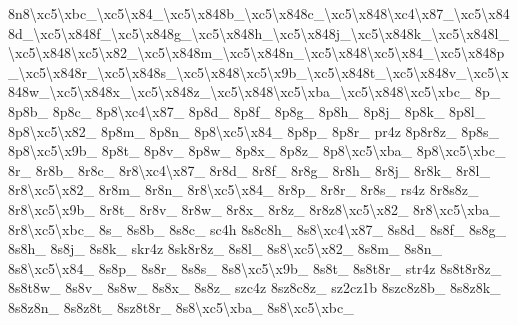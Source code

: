 {8n8\textbackslash{}xc5\textbackslash{}xbc\-\_\textbackslash{}xc5\textbackslash{}x84\-\_\textbackslash{}xc5\textbackslash{}x848b\-\_\textbackslash{}xc5\textbackslash{}x848c\-\_\textbackslash{}xc5\textbackslash{}x848\textbackslash{}xc4\textbackslash{}x87\-\_\textbackslash{}xc5\textbackslash{}x848d\-\_\textbackslash{}xc5\textbackslash{}x848f\-\_\textbackslash{}xc5\textbackslash{}x848g\-\_\textbackslash{}xc5\textbackslash{}x848h\-\_\textbackslash{}xc5\textbackslash{}x848j\-\_\textbackslash{}xc5\textbackslash{}x848k\-\_\textbackslash{}xc5\textbackslash{}x848l\-\_\textbackslash{}xc5\textbackslash{}x848\textbackslash{}xc5\textbackslash{}x82\-\_\textbackslash{}xc5\textbackslash{}x848m\-\_\textbackslash{}xc5\textbackslash{}x848n\-\_\textbackslash{}xc5\textbackslash{}x848\textbackslash{}xc5\textbackslash{}x84\-\_\textbackslash{}xc5\textbackslash{}x848p\-\_\textbackslash{}xc5\textbackslash{}x848r\-\_\textbackslash{}xc5\textbackslash{}x848s\-\_\textbackslash{}xc5\textbackslash{}x848\textbackslash{}xc5\textbackslash{}x9b\-\_\textbackslash{}xc5\textbackslash{}x848t\-\_\textbackslash{}xc5\textbackslash{}x848v\-\_\textbackslash{}xc5\textbackslash{}x848w\-\_\textbackslash{}xc5\textbackslash{}x848x\-\_\textbackslash{}xc5\textbackslash{}x848z\-\_\textbackslash{}xc5\textbackslash{}x848\textbackslash{}xc5\textbackslash{}xba\-\_\textbackslash{}xc5\textbackslash{}x848\textbackslash{}xc5\textbackslash{}xbc\-\_\- 8p\-\_\- 8p8b\-\_\- 8p8c\-\_\- 8p8\textbackslash{}xc4\textbackslash{}x87\-\_\- 8p8d\-\_\- 8p8f\-\_\- 8p8g\-\_\- 8p8h\-\_\- 8p8j\-\_\- 8p8k\-\_\- 8p8l\-\_\- 8p8\textbackslash{}xc5\textbackslash{}x82\-\_\- 8p8m\-\_\- 8p8n\-\_\- 8p8\textbackslash{}xc5\textbackslash{}x84\-\_\- 8p8p\-\_\- 8p8r\-\_\- pr4z 8p8r8z\-\_\- 8p8s\-\_\- 8p8\textbackslash{}xc5\textbackslash{}x9b\-\_\- 8p8t\-\_\- 8p8v\-\_\- 8p8w\-\_\- 8p8x\-\_\- 8p8z\-\_\- 8p8\textbackslash{}xc5\textbackslash{}xba\-\_\- 8p8\textbackslash{}xc5\textbackslash{}xbc\-\_\- 8r\-\_\- 8r8b\-\_\- 8r8c\-\_\- 8r8\textbackslash{}xc4\textbackslash{}x87\-\_\- 8r8d\-\_\- 8r8f\-\_\- 8r8g\-\_\- 8r8h\-\_\- 8r8j\-\_\- 8r8k\-\_\- 8r8l\-\_\- 8r8\textbackslash{}xc5\textbackslash{}x82\-\_\- 8r8m\-\_\- 8r8n\-\_\- 8r8\textbackslash{}xc5\textbackslash{}x84\-\_\- 8r8p\-\_\- 8r8r\-\_\- 8r8s\-\_\- rs4z 8r8s8z\-\_\- 8r8\textbackslash{}xc5\textbackslash{}x9b\-\_\- 8r8t\-\_\- 8r8v\-\_\- 8r8w\-\_\- 8r8x\-\_\- 8r8z\-\_\- 8r8z8\textbackslash{}xc5\textbackslash{}x82\-\_\- 8r8\textbackslash{}xc5\textbackslash{}xba\-\_\- 8r8\textbackslash{}xc5\textbackslash{}xbc\-\_\- 8s\-\_\- 8s8b\-\_\- 8s8c\-\_\- sc4h 8s8c8h\-\_\- 8s8\textbackslash{}xc4\textbackslash{}x87\-\_\- 8s8d\-\_\- 8s8f\-\_\- 8s8g\-\_\- 8s8h\-\_\- 8s8j\-\_\- 8s8k\-\_\- skr4z 8sk8r8z\-\_\- 8s8l\-\_\- 8s8\textbackslash{}xc5\textbackslash{}x82\-\_\- 8s8m\-\_\- 8s8n\-\_\- 8s8\textbackslash{}xc5\textbackslash{}x84\-\_\- 8s8p\-\_\- 8s8r\-\_\- 8s8s\-\_\- 8s8\textbackslash{}xc5\textbackslash{}x9b\-\_\- 8s8t\-\_\- 8s8t8r\-\_\- str4z 8s8t8r8z\-\_\- 8s8t8w\-\_\- 8s8v\-\_\- 8s8w\-\_\- 8s8x\-\_\- 8s8z\-\_\- szc4z 8sz8c8z\-\_\- sz2cz1b 8szc8z8b\-\_\- 8s8z8k\-\_\- 8s8z8n\-\_\- 8s8z8t\-\_\- 8sz8t8r\-\_\- 8s8\textbackslash{}xc5\textbackslash{}xba\-\_\- 8s8\textbackslash{}xc5\textbackslash{}xbc\-\_\- }
